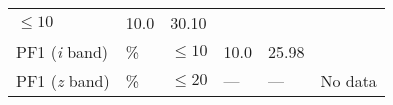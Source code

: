 \documentclass[DM,toc]{lsstdoc}
\begin{document}
\begin{longtable}[]{@{}llllll@{}}
\begin{minipage}[t]{0.17\columnwidth}
\(\leq 10\)\strut
\end{minipage} & \begin{minipage}[t]{0.17\columnwidth}\raggedright\strut
10.0\strut
\end{minipage} & \begin{minipage}[t]{0.12\columnwidth}\raggedright\strut
30.10\strut
\end{minipage} & \begin{minipage}[t]{0.17\columnwidth}\raggedright\strut
\strut
\end{minipage}\tabularnewline
\begin{minipage}[t]{0.14\columnwidth}\raggedright\strut
PF1 (\emph{i} band)\strut
\end{minipage} & \begin{minipage}[t]{0.06\columnwidth}\raggedright\strut
\%\strut
\end{minipage} & \begin{minipage}[t]{0.17\columnwidth}\raggedright\strut
\(\leq 10\)\strut
\end{minipage} & \begin{minipage}[t]{0.17\columnwidth}\raggedright\strut
10.0\strut
\end{minipage} & \begin{minipage}[t]{0.12\columnwidth}\raggedright\strut
25.98\strut
\end{minipage} & \begin{minipage}[t]{0.17\columnwidth}\raggedright\strut
\strut
\end{minipage}\tabularnewline
\begin{minipage}[t]{0.14\columnwidth}\raggedright\strut
PF1 (\emph{z} band)\strut
\end{minipage} & \begin{minipage}[t]{0.06\columnwidth}\raggedright\strut
\%\strut
\end{minipage} & \begin{minipage}[t]{0.17\columnwidth}\raggedright\strut
\(\leq 20\)\strut
\end{minipage} & \begin{minipage}[t]{0.17\columnwidth}\raggedright\strut
---\strut
\end{minipage} & \begin{minipage}[t]{0.12\columnwidth}\raggedright\strut
---\strut
\end{minipage} & \begin{minipage}[t]{0.17\columnwidth}\raggedright\strut
No data\strut
\end{minipage}\tabularnewline

\end{longtable}
\end{document}
